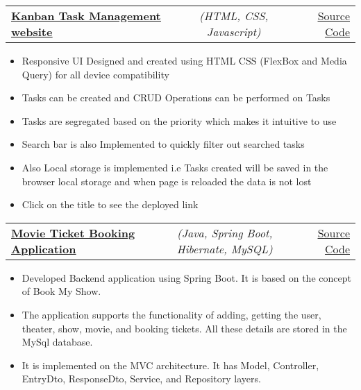\documentclass[a4paper,11pt]{article}
\makeatletter
\newcommand{\resumeItem}[1]{
  \item\small{#1}
}
\newcommand{\resumeItemListStart}{\begin{itemize}[rightmargin=0.11in]}
\newcommand{\resumeItemListEnd}{\end{itemize}}
\newcommand{\resumeTrioHeading}[3]{
  \item\small{
    \begin{tabular*}{0.96\textwidth}[t]{
      l@{\extracolsep{\fill}}c@{\extracolsep{\fill}}r
    }
      \textbf{#1} & \textit{#2} & #3
    \end{tabular*}
  }
}
\makeatother
\begin{document}
              \resumeTrioHeading{\href{https://rauchrods.github.io/My-Jira-kanban-Task-Management-System/}{\uline{Kanban Task Management website}}}{(HTML, CSS, Javascript) }{\href{https://github.com/rauchrods/My-Jira-kanban-Task-Management-System}{\uline{Source Code}}}
      \resumeItemListStart{}
        \resumeItem{Responsive UI Designed and created using HTML CSS (FlexBox and Media Query) for all device compatibility}
        \resumeItem{Tasks can be created and CRUD Operations can be performed on Tasks}
        \resumeItem{Tasks are segregated based on the priority which makes it intuitive to use}
        \resumeItem{Search bar is also Implemented to quickly filter out searched tasks}
        \resumeItem{Also Local storage is implemented i.e Tasks created will be saved in the browser local storage and when page is reloaded the data is not lost}
        \resumeItem{Click on the title to see the deployed link}
      \resumeItemListEnd{}

          \resumeTrioHeading{\href{https://github.com/rauchrods/bookmyshowbackend}{\uline{Movie Ticket Booking Application }}}{(Java, Spring Boot, Hibernate, MySQL) }{\href{https://github.com/rauchrods/bookmyshowbackend}{\uline{Source Code}}}
      \resumeItemListStart{}
        \resumeItem{Developed Backend application using Spring Boot. It is based on the concept of Book My Show.}
        \resumeItem{The application supports the functionality of adding, getting the user, theater, show, movie, and booking tickets. All these details are stored in the MySql database.}
        \resumeItem{It is implemented on the MVC architecture. It has Model, Controller, EntryDto, ResponseDto, Service, and Repository layers. }
      \resumeItemListEnd{}

  

      
\end{document}
